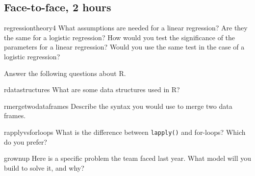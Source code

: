 \documentclass[a4paper]{article}
\begin{document}
\clearpage







\clearpage
\subsection{Face-to-face, 2 hours}
\begin{question}{regressiontheory4}
What assumptions are needed for a linear regression?
Are they the same for a logistic regression?
How would you test the significance of the parameters for a linear regression?
Would you use the same test in the case of a logistic regression?
\end{question}


\begin{questionwithnoanswer}
Answer the following questions about R.
\end{questionwithnoanswer}

\begin{subquestion}{rdatastructures}
What are some data structures used in R?
\end{subquestion}



\begin{subquestion}{rmergetwodataframes}
Describe the syntax you would use to merge two data frames.
\end{subquestion}



\begin{subquestion}{rapplyvsforloops}
What is the difference between \verb+lapply()+ and for-loops?
Which do you prefer?
\end{subquestion}


\begin{question}{grownup}
Here is a specific problem the team faced last year.
What model will you build to solve it, and why?
\end{question}

 \clearpage


\clearpage




\clearpage
\end{document}
